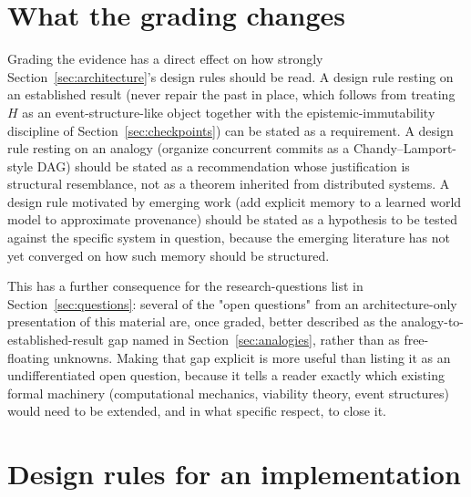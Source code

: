 \documentclass[11pt]{article}
\begin{document}
\section{What the grading changes}
\label{sec:consequences-of-grading}

Grading the evidence has a direct effect on how strongly Section~\ref{sec:architecture}'s design rules should be read. A design rule resting on an established result (never repair the past in place, which follows from treating $H$ as an event-structure-like object together with the epistemic-immutability discipline of Section~\ref{sec:checkpoints}) can be stated as a requirement. A design rule resting on an analogy (organize concurrent commits as a Chandy--Lamport-style DAG) should be stated as a recommendation whose justification is structural resemblance, not as a theorem inherited from distributed systems. A design rule motivated by emerging work (add explicit memory to a learned world model to approximate provenance) should be stated as a hypothesis to be tested against the specific system in question, because the emerging literature has not yet converged on how such memory should be structured.

This has a further consequence for the research-questions list in Section~\ref{sec:questions}: several of the "open questions" from an architecture-only presentation of this material are, once graded, better described as the analogy-to-established-result gap named in Section~\ref{sec:analogies}, rather than as free-floating unknowns. Making that gap explicit is more useful than listing it as an undifferentiated open question, because it tells a reader exactly which existing formal machinery (computational mechanics, viability theory, event structures) would need to be extended, and in what specific respect, to close it.

\section{Design rules for an implementation}
\label{sec:design-rules}
\end{document}
